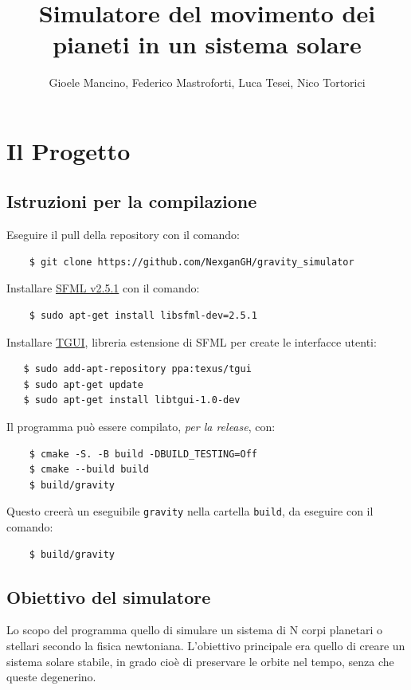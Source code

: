 \documentclass{article}
\title{Simulatore del movimento dei pianeti in un sistema solare}
\author{Gioele Mancino, Federico Mastroforti, Luca Tesei, Nico Tortorici}
\begin{document}
\maketitle
\section{Il Progetto}
\subsection{Istruzioni per la compilazione}
Eseguire il pull della repository con il comando:
\begin{verbatim}
    $ git clone https://github.com/NexganGH/gravity_simulator
\end{verbatim}

Installare \href{https://www.sfml-dev.org/tutorials/2.5/start-linux.php}{SFML v2.5.1} con il comando:
\begin{verbatim}
    $ sudo apt-get install libsfml-dev=2.5.1
\end{verbatim}

Installare \href{https://www.sfml-dev.org/tutorials/2.5/start-linux.php}{TGUI}, libreria estensione di SFML per create le interfacce utenti:
\begin{verbatim}
   $ sudo add-apt-repository ppa:texus/tgui
   $ sudo apt-get update
   $ sudo apt-get install libtgui-1.0-dev
    \end{verbatim}

Il programma può essere compilato, \textit{per la release}, con:
\begin{verbatim}
    $ cmake -S. -B build -DBUILD_TESTING=Off
    $ cmake --build build
    $ build/gravity
\end{verbatim}

Questo creerà un eseguibile \verb|gravity| nella cartella \verb|build|, da eseguire con il comando:
\begin{verbatim}
    $ build/gravity
\end{verbatim}

\subsection{Obiettivo del simulatore}
Lo scopo del programma quello di simulare un sistema di N corpi planetari o stellari secondo la fisica newtoniana. L'obiettivo principale era quello di creare un sistema solare stabile, in grado cioè di preservare le orbite nel tempo, senza che queste degenerino.
\end{document}

